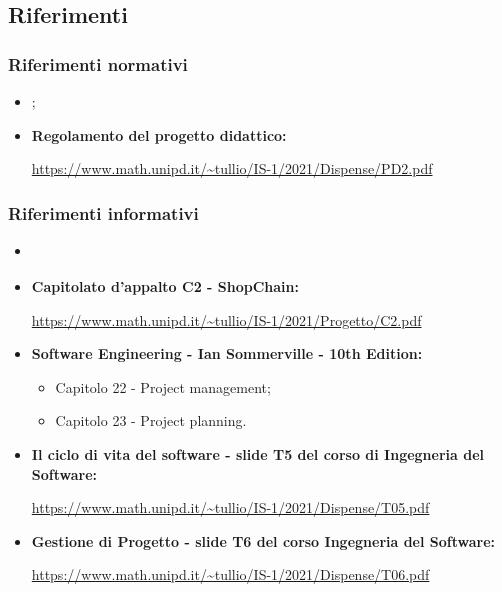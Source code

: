 \subsection{Riferimenti} \label{subsection:intro_riferimenti}
\subsubsection{Riferimenti normativi} \label{subsubsection:intro_riferimenti_normativi}
\begin{itemize}
  \item \textbf{\docNameVersionNdP{}};
  \item \textbf{Regolamento del progetto didattico:}
  \begin{center}
    \url{https://www.math.unipd.it/~tullio/IS-1/2021/Dispense/PD2.pdf}
  \end{center}
\end{itemize}
\subsubsection{Riferimenti informativi} \label{subsubsection:intro_riferimenti_informativi}
\begin{itemize}
  \item \textbf{\docNameVersionAdR{}}
  \item \textbf{Capitolato d'appalto C2 - ShopChain:}
  \begin{center}
    \url{https://www.math.unipd.it/~tullio/IS-1/2021/Progetto/C2.pdf}
  \end{center}
  \item \textbf{Software Engineering - Ian Sommerville - 10th Edition:}
  \begin{itemize}
    \item Capitolo 22 - Project management;
    \item Capitolo 23 - Project planning.
  \end{itemize}
  \item \textbf{Il ciclo di vita del software - slide T5 del corso di Ingegneria del Software:}
  \begin{center}
    \url{https://www.math.unipd.it/~tullio/IS-1/2021/Dispense/T05.pdf}
  \end{center}
  \item \textbf{Gestione di Progetto - slide T6 del corso Ingegneria del Software:}
  \begin{center}
    \url{https://www.math.unipd.it/~tullio/IS-1/2021/Dispense/T06.pdf}
  \end{center}
\end{itemize}

